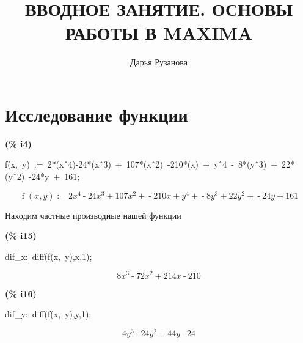 \documentclass[a4paper, 12pt]{article}
\begin{document}
\title{ВВОДНОЕ ЗАНЯТИЕ. ОСНОВЫ РАБОТЫ В MAXIMA}
\author{Дарья Рузанова}
{\let\newpage\relax\maketitle}
\tableofcontents
\section{Исследование функции}

\noindent
\begin{minipage}[t]{4.000000em}\color{red}\bfseries
(\% i4)	
\end{minipage}
\begin{minipage}[t]{\textwidth}\color{blue}
f(x,\ y)\ :=\ 2*(x\^\ 4)-24*(x\^\ 3)\ +\ 107*(x\^\ 2)\ -210*(x)\ +\ y\^\ 4\ -\ 8*(y\^\ 3)\ +\ 22*(y\^\ 2)\ -24*y\ +\ 161;
\end{minipage}
\[\displaystyle \tag{\% o4} 
\operatorname{f}\left( x\operatorname{,}y\right) \operatorname{:=}2 {{x}^{4}}\operatorname{-}24 {{x}^{3}}\operatorname{+}107 {{x}^{2}}\operatorname{+}\operatorname{-}210 x\operatorname{+}{{y}^{4}}\operatorname{+}\operatorname{-}8 {{y}^{3}}\operatorname{+
}22 {{y}^{2}}\operatorname{+}\operatorname{-}24 y\operatorname{+}161\mbox{}
\]


\noindent

Находим частные производные нашей функции

\begin{minipage}[t]{4.000000em}\color{red}\bfseries
(\% i15)	
\end{minipage}
\begin{minipage}[t]{\textwidth}\color{blue}
dif\_x:\ diff(f(x,\ y),x,1);
\end{minipage}
\[\displaystyle \tag{dif\_ x} 
8 {{x}^{3}}\operatorname{-}72 {{x}^{2}}\operatorname{+}214 x\operatorname{-}210\mbox{}
\]


\noindent
\begin{minipage}[t]{4.000000em}\color{red}\bfseries
(\% i16)	
\end{minipage}
\begin{minipage}[t]{\textwidth}\color{blue}
dif\_y:\ diff(f(x,\ y),y,1);
\end{minipage}
\[\displaystyle \tag{dif\_ y} 
4 {{y}^{3}}\operatorname{-}24 {{y}^{2}}\operatorname{+}44 y\operatorname{-}24\mbox{}
\]
\end{document}
